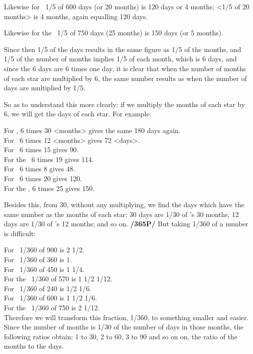 Likewise for \Mercury\, 1/5 of 600 days (or 20 months) is 120 days or 4 months; <1/5 of 20 months> is 4 months, again equalling 120 days.

Likewise for the \Moon\, 1/5 of 750 days (25 months) is 150 days (or 5 months).

Since then 1/5 of the days results in the same figure as 1/5 of the months, and 1/5 of the number of months implies 1/5 of each month, which is 6 days, and since the 6 days are 6 times one day, it is clear that when the number of months of each star are multiplied by 6, the same number results as when the number of days are multiplied by 1/5.

So as to understand this more clearly: if we multiply the months of each star by 6, we will get the days of each star. For example:

\noindent For \Saturn, 6 times 30 <months> gives the same 180 days again.\\
For \Jupiter\, 6 times 12 <months> gives 72 <days>.\\
For \Mars\, 6 times 15 gives 90.\\
For the \Sun\, 6 times 19 gives 114.\\
For \Venus\, 6 times 8 gives 48. \\
For \Mercury\, 6 times 20 gives 120.\\
For the \Moon, 6 times 25 gives 150.

Besides this, from 30, without any multiplying, we find the days which have the same number as the months of each star: 30 days are 1/30 of \Saturn’s 30 months; 12 days are 1/30 of \Jupiter’s 12 months; and so on. \textbf{/365P/} But taking 1/360 of a number is difficult:

\noindent For \Saturn\, 1/360 of 900 is 2 1/2. \\
For \Jupiter\, 1/360 of 360 is 1. \\
For \Mars\, 1/360 of 450 is 1 1/4. \\
For the \Sun\, 1/360 of 570 is 1 1/2 1/12. \\
For \Venus\, 1/360 of 240 is 1/2 1/6. \\
For \Mercury\, 1/360 of 600 is 1 1/2 1/6. \\
For the \Moon\, 1/360 of 750 is 2 1/12. \\

Therefore we will transform this fraction, 1/360, to something smaller and easier. Since the number of months is 1/30 of the number of days in those months, the following ratios obtain: 1 to 30, 2 to 60, 3 to 90 and so on on, the ratio of the months to the days. 

